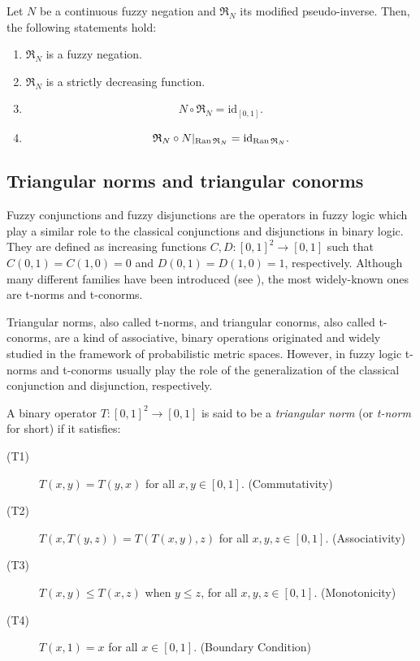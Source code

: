 \begin{proposition}\label{prop:properties_modifiedpseudoinverse}
	Let $N$ be a continuous fuzzy negation and $\mathfrak{R}_N$ its modified pseudo-inverse. Then, the following statements hold:
	\begin{enumerate}[label=(\roman*)]
		\item $\mathfrak{R}_N$ is a fuzzy negation.
		\item $\mathfrak{R}_N$ is a strictly decreasing function.
		\item 
		\begin{equation}\label{eq:PropositionRN(iii)}
			N \circ \mathfrak{R}_N = \text{id}_{[0,1]}.
		\end{equation}
		\item \begin{equation}\label{eq:PropositionRN(iv)}		
			\mathfrak{R}_N \circ N |_{\operatorname{Ran} \mathfrak{R}_N} = \text{id}_{\operatorname{Ran} \mathfrak{R}_N}.
		\end{equation}
	\end{enumerate}
\end{proposition}	

\subsection{Triangular norms and triangular conorms}

Fuzzy conjunctions and fuzzy disjunctions are the operators in fuzzy logic which play a similar role to the classical conjunctions and disjunctions in binary logic. They are defined as increasing functions $C,D:[0,1]^2 \to [0,1]$ such that $C(0,1)=C(1,0)=0$ and $D(0,1)=D(1,0)=1$, respectively. Although many different families have been introduced (see \cite{Beliakov2010,Calvo2002,Grabisch2009}), the most widely-known ones are t-norms and t-conorms.

Triangular norms, also called t-norms, and triangular conorms, also called t-conorms, are a kind of associative, binary operations originated and widely studied in the framework of probabilistic metric spaces. However, in fuzzy logic t-norms and t-conorms usually play the role of the generalization of the classical conjunction and disjunction, respectively.
\begin{definition}\label{def:tnorm}
	A binary operator $T:[0,1]^2 \to [0,1]$ is said to be a \emph{triangular norm} (or \emph{t-norm} for short) if it satisfies:
	\begin{description}
		\item[(T1)] $T(x,y)=T(y,x)$ for all $x,y \in [0,1]$. \hfill (Commutativity)
		\item[(T2)] $T(x,T(y,z))=T(T(x,y),z)$ for all $x,y,z \in [0,1]$. \hfill (Associativity)
		\item[(T3)] $T(x,y) \leq T(x,z)$ when $y \leq z$, for all $x,y,z \in [0,1]$. \hfill (Monotonicity)
		\item[(T4)] $T(x,1)=x$ for all $x \in [0,1]$. \hfill (Boundary Condition)
	\end{description}
\end{definition}


